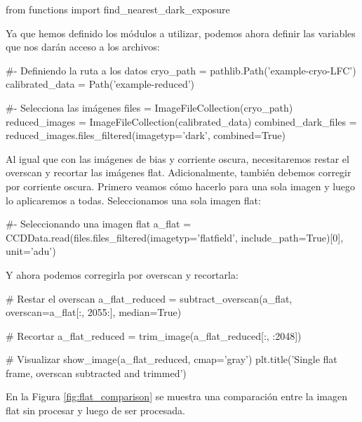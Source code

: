\begin{pyin}
from functions import find_nearest_dark_exposure
\end{pyin}

Ya que hemos definido los módulos a utilizar, podemos ahora definir las variables que nos darán acceso a los archivos:
\begin{pyin}[]
#- Definiendo la ruta a los datos
cryo_path = pathlib.Path('example-cryo-LFC')
calibrated_data = Path('example-reduced')

#- Selecciona las imágenes
files = ImageFileCollection(cryo_path)
reduced_images = ImageFileCollection(calibrated_data)
combined_dark_files = reduced_images.files_filtered(imagetyp='dark', 
                                                    combined=True)
\end{pyin}

Al igual que con las imágenes de bias y corriente oscura, necesitaremos restar el overscan y recortar las imágenes flat. Adicionalmente, también debemos corregir por corriente oscura. Primero veamos cómo hacerlo para una sola imagen y luego lo aplicaremos a todas. Seleccionamos una sola imagen flat:
\begin{pyin}[]
#- Seleccionando una imagen flat
a_flat = CCDData.read(files.files_filtered(imagetyp='flatfield',
                    include_path=True)[0], unit='adu')
\end{pyin}

Y ahora podemos corregirla por overscan y recortarla:
\begin{pyin}[]
# Restar el overscan
a_flat_reduced = subtract_overscan(a_flat, 
                                        overscan=a_flat[:, 2055:], 
                                        median=True)

# Recortar
a_flat_reduced = trim_image(a_flat_reduced[:, :2048])

# Visualizar
show_image(a_flat_reduced, cmap='gray')
plt.title('Single flat frame, overscan subtracted and trimmed')
\end{pyin}

En la Figura \ref{fig:flat_comparison} se muestra una comparación entre la imagen flat sin procesar y luego de ser procesada. 

